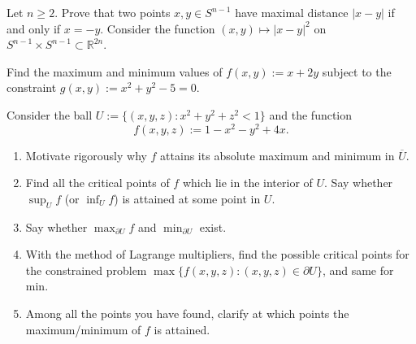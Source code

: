 \begin{exercise}
\label{ex:antipodal_max_distance}
Let $n \geq 2$. Prove that two points $x,y \in S^{n-1}$ have maximal distance $|x-y|$ if and
only if $x = -y$. Consider the function $(x,y) \mapsto |x-y|^2$ on
$S^{n-1}\times S^{n-1} \subset \mathbb{R}^{2n}$.
\end{exercise}

\begin{aiexercise}
\label{ex:ai_lagrange_circle}
Find the maximum and minimum values of $f(x,y) := x + 2y$ subject to the constraint $g(x,y) := x^2 + y^2 - 5 = 0$.
\end{aiexercise}




\begin{exercise}
\label{ex:lagrange_ball_extrema}
Consider the ball $U := \{(x,y,z) : x^2+y^2+z^2 < 1\}$ and the function
\[f(x,y,z) := 1 - x^2 - y^2 + 4x.\]
\begin{enumerate}[label=\textbf{(\alph*)}]
  \item Motivate rigorously why $f$ attains its absolute maximum and minimum in $\overline{U}$.
  \item Find all the critical points of $f$ which lie in the interior of $U$. Say whether
    $\sup_U f$ (or $\inf_U f$) is attained at some point in $U$.
  \item Say whether $\max_{\partial U} f$ and $\min_{\partial U}$ exist.
  \item With the method of Lagrange multipliers, find the possible critical points for the
    constrained problem $\max\{f(x,y,z) : (x,y,z) \in \partial U\}$, and same for min.
  \item Among all the points you have found, clarify at which points the maximum/minimum of $f$
    is attained.
\end{enumerate}
\end{exercise}

